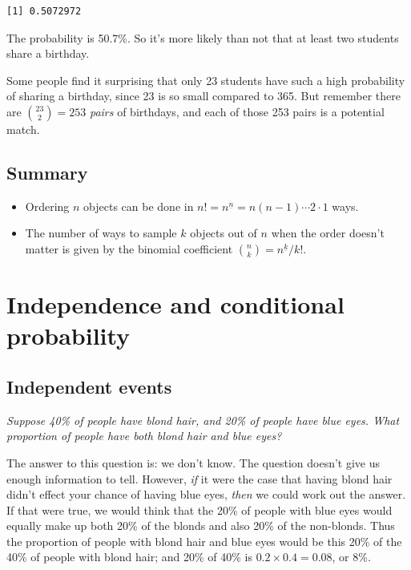 \documentclass[
  letterpaper,
]{report}
\providecommand{\tightlist}{%
  \setlength{\itemsep}{0pt}\setlength{\parskip}{0pt}}\usepackage{longtable,booktabs,array}
\theoremstyle{definition}
\theoremstyle{definition}
\theoremstyle{remark}
\begin{document}
\begin{verbatim}
[1] 0.5072972
\end{verbatim}

The probability is 50.7\%. So it's more likely than not that at least
two students share a birthday.

Some people find it surprising that only 23 students have such a high
probability of sharing a birthday, since 23 is so small compared to 365.
But remember there are \(\binom{23}{2} = 253\) \emph{pairs} of
birthdays, and each of those 253 pairs is a potential match.

\hypertarget{summary-L06}{%
\section*{Summary}\label{summary-L06}}


\begin{itemize}
\tightlist
\item
  Ordering \(n\) objects can be done in
  \(n! = n^{\underline{n}} = n(n-1)\cdots2\cdot1\) ways.
\item
  The number of ways to sample \(k\) objects out of \(n\) when the order
  doesn't matter is given by the binomial coefficient
  \(\binom nk = {n}^{\underline{k}}/k!\).
\end{itemize}

\hypertarget{L07-conditional}{%
\chapter{Independence and conditional
probability}\label{L07-conditional}}

\hypertarget{independent-events}{%
\section{Independent events}\label{independent-events}}

\emph{Suppose 40\% of people have blond hair, and 20\% of people have
blue eyes. What proportion of people have both blond hair and blue
eyes?}

The answer to this question is: we don't know. The question doesn't give
us enough information to tell. However, \emph{if} it were the case that
having blond hair didn't effect your chance of having blue eyes,
\emph{then} we could work out the answer. If that were true, we would
think that the 20\% of people with blue eyes would equally make up both
20\% of the blonds and also 20\% of the non-blonds. Thus the proportion
of people with blond hair and blue eyes would be this 20\% of the 40\%
of people with blond hair; and 20\% of 40\% is
\(0.2 \times 0.4 = 0.08\), or 8\%.
\end{document}
